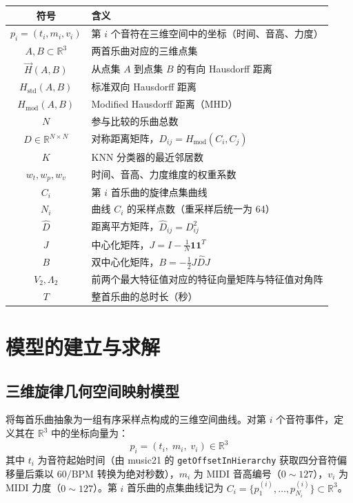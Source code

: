 \documentclass[withoutpreface]{cumcmthesis}
\begin{document}
\begin{center}
\begin{tabularx}{\textwidth}{@{}c >{\raggedright\arraybackslash}X@{}}
\toprule
\textbf{符号} & \textbf{含义} \\
\midrule
$p_i = (t_i, m_i, v_i)$ & 第 $i$ 个音符在三维空间中的坐标（时间、音高、力度） \\
$A, B \subset \mathbb{R}^3$ & 两首乐曲对应的三维点集 \\
$\vec{H}(A, B)$ & 从点集 $A$ 到点集 $B$ 的有向 Hausdorff 距离 \\
$H_{\text{std}}(A, B)$ & 标准双向 Hausdorff 距离 \\
$H_{\text{mod}}(A, B)$ & Modified Hausdorff 距离（MHD） \\
$N$ & 参与比较的乐曲总数 \\
$D \in \mathbb{R}^{N \times N}$ & 对称距离矩阵，$D_{ij} = H_{\text{mod}}(C_i, C_j)$ \\
$K$ & KNN 分类器的最近邻居数 \\
$w_t, w_p, w_v$ & 时间、音高、力度维度的权重系数 \\
$C_i$ & 第 $i$ 首乐曲的旋律点集曲线 \\
$N_i$ & 曲线 $C_i$ 的采样点数（重采样后统一为 64） \\
$\hat{D}$ & 距离平方矩阵，$\hat{D}_{ij} = D_{ij}^2$ \\
$J$ & 中心化矩阵，$J = I - \frac{1}{N}\mathbf{1}\mathbf{1}^T$ \\
$B$ & 双中心化矩阵，$B = -\frac{1}{2}J\hat{D}J$ \\
$V_2, \Lambda_2$ & 前两个最大特征值对应的特征向量矩阵与特征值对角阵 \\
$T$ & 整首乐曲的总时长（秒） \\
\bottomrule
\end{tabularx}
\end{center}

\section{模型的建立与求解}

\subsection{三维旋律几何空间映射模型}

将每首乐曲抽象为一组有序采样点构成的三维空间曲线。对第 $i$ 个音符事件，定义其在 $\mathbb{R}^3$ 中的坐标向量为：
\begin{equation}
    p_i = (t_i,\; m_i,\; v_i) \in \mathbb{R}^3
    \label{eq:point}
\end{equation}
其中 $t_i$ 为音符起始时间（由 music21 的 \texttt{getOffsetInHierarchy} 获取四分音符偏移量后乘以 $60/\text{BPM}$ 转换为绝对秒数），$m_i$ 为 MIDI 音高编号（$0 \sim 127$），$v_i$ 为 MIDI 力度（$0 \sim 127$）。第 $i$ 首乐曲的点集曲线记为 $C_i = \{p_1^{(i)}, \ldots, p_{N_i}^{(i)}\} \subset \mathbb{R}^3$。
\end{document}
